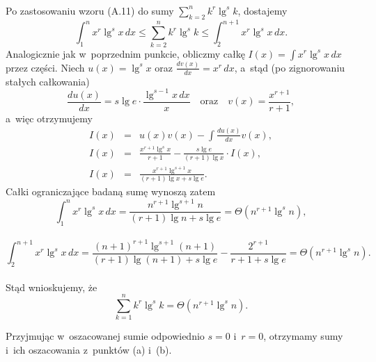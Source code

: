 \subsubsection{} %
Po zastosowaniu wzoru (A.11) do sumy $\sum_{k=2}^nk^r\lg^sk$, dostajemy
\[
	\int_1^nx^r\lg^sx\,dx\le\sum_{k=2}^nk^r\lg^sk\le\int_2^{n+1}x^r\lg^sx\,dx.
\]
Analogicznie jak w~poprzednim punkcie, obliczmy całkę $I(x) = \int x^r\lg^sx\,dx$ przez części. Niech $u(x)=\lg^sx$ oraz $\frac{dv(x)}{dx}=x^r\,dx$, a~stąd (po zignorowaniu stałych całkowania)
\[
	\frac{du(x)}{dx} = s\lg e\cdot\frac{\lg^{s-1}x\,dx}{x}\quad\mbox{oraz}\quad v(x)=\frac{x^{r+1}}{r+1},
\]
a~więc otrzymujemy
\begin{eqnarray*}
	I(x) &=& u(x)v(x)-\int\frac{du(x)}{dx}v(x), \\
	I(x) &=& \frac{x^{r+1}\lg^sx}{r+1}-\frac{s\lg e}{(r+1)\lg x}\cdot I(x), \\
	I(x) &=& \frac{x^{r+1}\lg^{s+1}x}{(r+1)\lg x+s\lg e}.
\end{eqnarray*}
Całki ograniczające badaną sumę wynoszą zatem
\[
	{\displaystyle \int_1^nx^r\lg^sx\,dx} = \dfrac{n^{r+1}\lg^{s+1}n}{(r+1)\lg n+s\lg e} = \Theta(n^{r+1}\lg^sn),
\]
\\
\[
	{\displaystyle \int_2^{n+1}x^r\lg^sx\,dx} = \dfrac{(n+1)^{r+1}\lg^{s+1}(n+1)}{(r+1)\lg(n+1)+s\lg e}-\dfrac{2^{r+1}}{r+1+s\lg e} = \Theta(n^{r+1}\lg^sn).
\]
\\
Stąd wnioskujemy, że
\[
	\sum_{k=1}^nk^r\lg^sk = \Theta(n^{r+1}\lg^sn).
\]

Przyjmując w~oszacowanej sumie odpowiednio $s=0$ i~$r=0$, otrzymamy sumy i~ich oszacowania z~punktów (a) i~(b).
